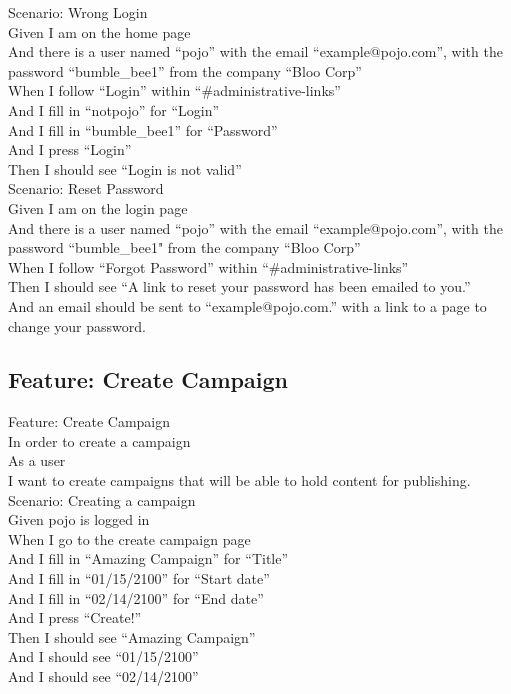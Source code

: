\documentclass[12pt]{article}
\begin{document}
Scenario: Wrong Login \\
  Given I am on the home page \\
  And there is a user named ``pojo'' with the email ``example@pojo.com'', with the password ``bumble\_bee1'' from the company ``Bloo Corp'' \\
  When I follow ``Login'' within ``\#administrative-links'' \\
  And I fill in ``notpojo'' for ``Login'' \\
  And I fill in ``bumble\_bee1'' for ``Password'' \\
  And I press ``Login'' \\
  Then I should see ``Login is not valid'' \\

Scenario: Reset Password \\
  Given I am on the login page \\
  And there is a user named ``pojo'' with the email ``example@pojo.com'', with the password ``bumble\_bee1" from the company ``Bloo Corp'' \\
  When I follow ``Forgot Password'' within ``\#administrative-links'' \\
  Then I should see ``A link to reset your password has been emailed to you.'' \\
  And an email should be sent to ``example@pojo.com.'' with a link to a page to change your password. \\

\subsection{Feature: Create Campaign}

Feature: Create Campaign \\
  In order to create a campaign \\
  As a user \\
  I want to create campaigns that will be able to hold content for publishing. \\
  
Scenario: Creating a campaign \\
  Given pojo is logged in \\
  When I go to the create campaign page \\
  And I fill in ``Amazing Campaign'' for ``Title'' \\
  And I fill in ``01/15/2100'' for ``Start date'' \\
  And I fill in ``02/14/2100'' for ``End date''   \\
  And I press ``Create!'' \\
  Then I should see ``Amazing Campaign'' \\
  And I should see ``01/15/2100'' \\
  And I should see ``02/14/2100'' \\
\end{document}
